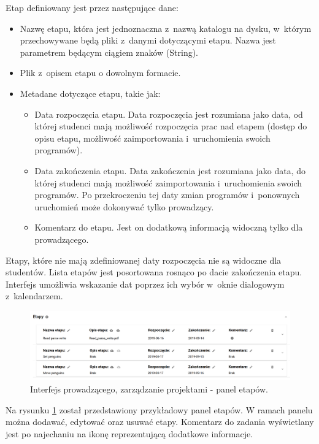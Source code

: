 Etap definiowany jest przez następujące dane:
\begin {itemize}
    \item Nazwę etapu, która jest jednoznaczna z~nazwą katalogu na dysku, w~którym przechowywane będą pliki z~danymi dotyczącymi etapu.
    Nazwa jest parametrem będącym ciągiem znaków (String).
    \item Plik z~opisem etapu o dowolnym formacie.
    \item Metadane dotyczące etapu, takie jak:
    \begin {itemize}
        \item Data rozpoczęcia etapu.
        Data rozpoczęcia jest rozumiana jako data, od której studenci mają możliwość rozpoczęcia prac nad etapem (dostęp do opisu etapu, możliwość zaimportowania i~uruchomienia swoich programów).
        \item Data zakończenia etapu.
        Data zakończenia jest rozumiana jako data, do której studenci mają możliwość zaimportowania i~uruchomienia swoich programów.
        Po przekroczeniu tej daty zmian programów i~ponownych uruchomień może dokonywać tylko prowadzący.
        \item Komentarz do etapu.
        Jest on dodatkową informacją widoczną tylko dla prowadzącego.
    \end{itemize}
\end {itemize}

Etapy, które nie mają zdefiniowanej daty rozpoczęcia nie są widoczne dla studentów.
Lista etapów jest posortowana rosnąco po dacie zakończenia etapu.
Interfejs umożliwia wskazanie dat poprzez ich wybór w~oknie dialogowym z~kalendarzem.

\begin{figure}[h]
    \centering
    \includegraphics[width = 16cm]{chapter04/lecturer_stages.png}
    \caption{Interfejs prowadzącego, zarządzanie projektami - panel etapów.}
    \label{fig:lecturer_stages}
\end{figure}


Na rysunku \ref{fig:lecturer_stages} został przedstawiony przykładowy panel etapów.
W ramach panelu można dodawać, edytować oraz usuwać etapy.
Komentarz do zadania wyświetlany jest po najechaniu na ikonę reprezentującą dodatkowe informacje.

